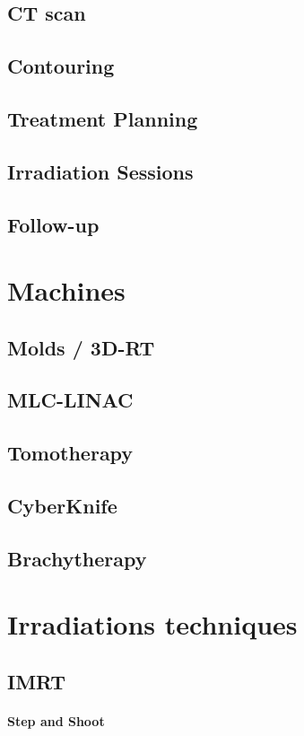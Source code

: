 \subsection{CT scan}
\subsection{Contouring}
\subsection{Treatment Planning}
\subsection{Irradiation Sessions}
\subsection{Follow-up}

\section{Machines}
\subsection{Molds / 3D-RT}
\subsection{MLC-LINAC}
\subsection{Tomotherapy}
\subsection{CyberKnife}
\subsection{Brachytherapy}

\section{Irradiations techniques}
\subsection{IMRT}
\paragraph{Step and Shoot}
